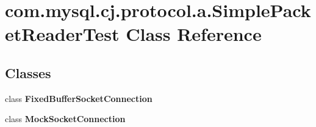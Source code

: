 \hypertarget{classcom_1_1mysql_1_1cj_1_1protocol_1_1a_1_1_simple_packet_reader_test}{}\section{com.\+mysql.\+cj.\+protocol.\+a.\+Simple\+Packet\+Reader\+Test Class Reference}
\label{classcom_1_1mysql_1_1cj_1_1protocol_1_1a_1_1_simple_packet_reader_test}
\subsection*{Classes}
\begin{DoxyCompactItemize}
\item 
class {\bfseries Fixed\+Buffer\+Socket\+Connection}
\item 
class {\bfseries Mock\+Socket\+Connection}
\end{DoxyCompactItemize}
